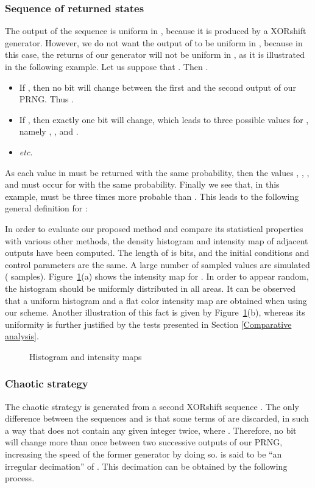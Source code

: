 \documentclass[journal]{IEEEtran}
\begin{document}
\subsubsection{Sequence  of returned states}
\label{algo m}
The output of the sequence  is uniform in , because it is produced by a XORshift generator. However, we do not want the output of  to be uniform in , because in this case, the returns of our generator will not be uniform in , as it is illustrated in the following example. Let us suppose that . Then .
\begin{itemize}
\item If , then no bit will change between the first and the second output of our PRNG. Thus .
\item If , then exactly one bit will change, which leads to three possible values for , namely , , and .
\item \emph{etc.}
\end{itemize}
As each value in  must be returned with the same probability, then the values , , , and  must occur for  with the same probability. Finally we see that, in this example,  must be three times more probable than .
This leads to the following general definition for :




In order to evaluate our proposed method and compare its statistical properties with various other methods, the density histogram and intensity map of adjacent outputs have been computed. The length of  is  bits, and the initial conditions and control
parameters are the same. A large number of
sampled values are simulated ( samples). 
Figure~\ref{Histogram and intensity map}(a) shows the intensity map for .
In order to appear random, the histogram should be uniformly distributed in all areas. 
It can be observed that a uniform histogram and a flat color intensity map are obtained when using our scheme. 
Another illustration of this fact is given by Figure~\ref{Histogram and intensity map}(b), whereas its uniformity is further justified by the tests presented in Section \ref{Comparative analysis}.



\begin{figure}[!t]
\centering
{}

\caption{Histogram and intensity maps}
\label{Histogram and intensity map}
\end{figure}


\subsubsection{Chaotic strategy}
\label{Chaotic strategy}
The chaotic strategy  is generated from a second XORshift sequence . The only difference between the sequences  and  is that some terms of  are discarded, in such a way that  does not contain any given integer twice, where . Therefore, no bit will change more than once between two successive outputs of our PRNG, increasing the speed of the former generator by doing so.  is said to be ``an irregular decimation'' of . This decimation can be obtained by the following process.
\end{document}
